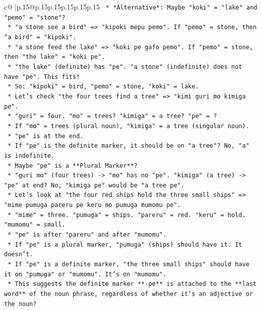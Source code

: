 \documentclass{article}
\begin{document}
{\begin{supertabular}{c@{$\;$}|p{.15\linewidth}@{}p{.15\linewidth}p{.15\linewidth}p{.15\linewidth}p{.15\linewidth}p{.15\linewidth}}
{{{\texttt{        *   *Alternative*: Maybe "koki" = "lake" and "pemo" = "stone"?} \\
\texttt{            *   "a stone see a bird" => "kipoki mepu pemo". If "pemo" = stone, then "a bird" = "kipoki".} \\
\texttt{            *   "a stone feed the lake" => "koki pe gafo pemo". If "pemo" = stone, then "the lake" = "koki pe".} \\
\texttt{            *   "the lake" (definite) has "pe". "a stone" (indefinite) does not have "pe". This fits!} \\
\texttt{            *   So: "kipoki" = bird, "pemo" = stone, "koki" = lake.} \\
\texttt{            *   Let's check "the four trees find a tree" => "kimi guri mo kimiga pe".} \\
\texttt{                *   "guri" = four. "mo" = trees? "kimiga" = a tree? "pe" = ?} \\
\texttt{                *   If "mo" = trees (plural noun), "kimiga" = a tree (singular noun).} \\
\texttt{                *   "pe" is at the end.} \\
\texttt{                *   If "pe" is the definite marker, it should be on "a tree"? No, "a" is indefinite.} \\
\texttt{                *   Maybe "pe" is a **Plural Marker**?} \\
\texttt{                *   "guri mo" (four trees) {-}> "mo" has no "pe". "kimiga" (a tree) {-}> "pe" at end? No, "kimiga pe" would be "a tree pe".} \\
\texttt{                *   Let's look at "the four red ships hold the three small ships" => "mime pumuga pareru pe keru mo pumuga mumomu pe".} \\
\texttt{                    *   "mime" = three. "pumuga" = ships. "pareru" = red. "keru" = hold. "mumomu" = small.} \\
\texttt{                    *   "pe" is after "pareru" and after "mumomu".} \\
\texttt{                    *   If "pe" is a plural marker, "pumuga" (ships) should have it. It doesn't.} \\
\texttt{                    *   If "pe" is a definite marker, "the three small ships" should have it on "pumuga" or "mumomu". It's on "mumomu".} \\
\texttt{                    *   This suggests the definite marker **{-}pe** is attached to the **last word** of the noun phrase, regardless of whether it's an adjective or the noun?} \\
}}}
\end{supertabular}}
\end{document}
